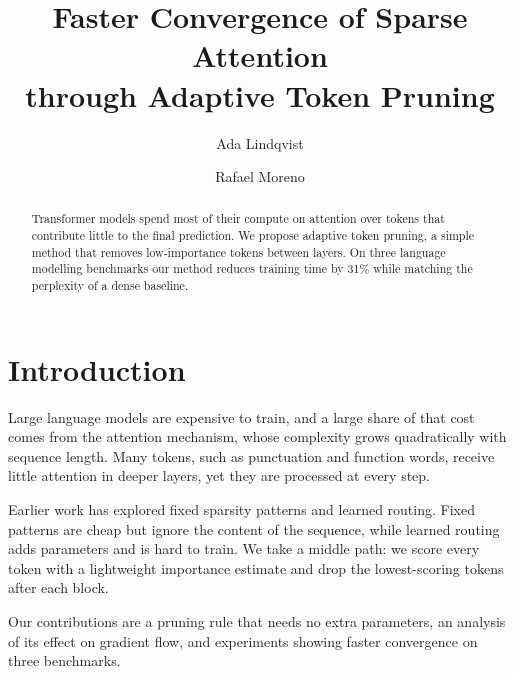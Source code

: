 \documentclass[11pt]{article}
\title{Faster Convergence of Sparse Attention\\through Adaptive Token Pruning}
\author{Ada Lindqvist \and Rafael Moreno}
\date{}
\begin{document}
\maketitle
\begin{abstract}
Transformer models spend most of their compute on attention over tokens that contribute little to the
final prediction. We propose adaptive token pruning, a simple method that removes low-importance tokens
between layers. On three language modelling benchmarks our method reduces training time by 31\% while
matching the perplexity of a dense baseline.
\end{abstract}

\section{Introduction}
Large language models are expensive to train, and a large share of that cost comes from the attention
mechanism, whose complexity grows quadratically with sequence length. Many tokens, such as punctuation
and function words, receive little attention in deeper layers, yet they are processed at every step.

Earlier work has explored fixed sparsity patterns and learned routing. Fixed patterns are cheap but
ignore the content of the sequence, while learned routing adds parameters and is hard to train. We take
a middle path: we score every token with a lightweight importance estimate and drop the lowest-scoring
tokens after each block.

Our contributions are a pruning rule that needs no extra parameters, an analysis of its effect on
gradient flow, and experiments showing faster convergence on three benchmarks.
\end{document}
